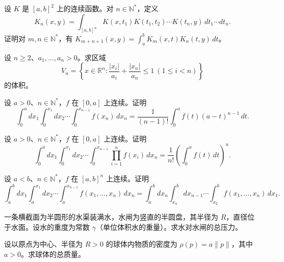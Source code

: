 \newpage
\noindent\begin{minipage}{\textwidth}
设 $K$ 是 $[a,b]^2$ 上的连续函数。对 $n\in\mathbb N^*$，定义\[K_n(x,y)=\int_{[a,b]^n}K(x,t_1)K(t_1,t_2)\cdots K(t_n,y)\,dt_1\cdots dt_n.\]证明对 $m,n\in\mathbb N^*$，有 $K_{m+n+1}(x,y)=\int_a^bK_m(x,t)K_n(t,y)\,dt$。
\end{minipage}\par\vfill
\noindent\begin{minipage}{\textwidth}
设 $n\ge2$、$a_1,\ldots,a_n>0$。求区域\[V_n=\left\{x\in\mathbb R^n:\frac{|x_i|}{a_i}+\frac{|x_n|}{a_n}\le1\ (1\le i<n)\right\}\]的体积。
\end{minipage}\par\vfill
\noindent\begin{minipage}{\textwidth}
设 $a>0$、$n\in\mathbb N^*$，$f$ 在 $[0,a]$ 上连续。证明\[\int_0^a dx_1\int_0^{x_1}dx_2\cdots\int_0^{x_{n-1}}f(x_n)\,dx_n=\frac1{(n-1)!}\int_0^af(t)(a-t)^{n-1}\,dt.\]
\end{minipage}\par\vfill
\newpage
\noindent\begin{minipage}{\textwidth}
设 $a>0$、$n\in\mathbb N^*$，$f$ 在 $[0,a]$ 上连续。证明\[\int_0^a dx_1\int_0^{x_1}dx_2\cdots\int_0^{x_{n-1}}\prod_{i=1}^nf(x_i)\,dx_n=\frac1{n!}\left(\int_0^af(t)\,dt\right)^n.\]
\end{minipage}\par\vfill
\noindent\begin{minipage}{\textwidth}
设 $a<b$、$n\in\mathbb N^*$，$f$ 在 $[a,b]^n$ 上连续。证明\[\int_a^b dx_1\int_a^{x_1}dx_2\cdots\int_a^{x_{n-1}}f(x_1,\ldots,x_n)\,dx_n=\int_a^bdx_n\int_{x_n}^bdx_{n-1}\cdots\int_{x_2}^bf(x_1,\ldots,x_n)\,dx_1.\]
\end{minipage}\par\vfill
\noindent\begin{minipage}{\textwidth}
一条横截面为半圆形的水渠装满水，水闸为竖直的半圆盘，其半径为 $R$，直径位于水面。设水的重度为常数 $\gamma$（单位体积水的重量）。求水对水闸的总压力。
\end{minipage}\par\vfill
\newpage
\noindent\begin{minipage}{\textwidth}
设以原点为中心、半径为 $R>0$ 的球体内物质的密度为 $\rho(p)=a\|p\|$，其中 $a>0$。求球体的总质量。
\end{minipage}\par\vfill
